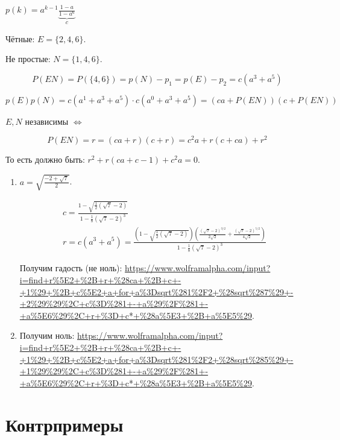 \documentclass[12pt, a4paper]{article}
\begin{document}
$p(k) = a^{k - 1} \underbrace{\frac{1 - a}{1 - a^6}}_c$

Чётные: $E = \{2, 4, 6\}$.

Не простые: $N = \{1, 4, 6\}$.

\begin{equation}
    P(EN) = P(\{4, 6\}) = p(N) - p_1 = p(E) - p_2 = c(a^3 + a^5)
\end{equation}

\begin{equation}
    p(E)p(N) = c(a^1 + a^3 + a^5) \cdot c(a^0 + a^3 + a^5) = (c a + P(EN))(c + P(EN))
\end{equation}

$E, N$ независимы $\Leftrightarrow$

\begin{equation}
    P(EN) = r = (ca + r)(c + r) = c^2 a + r(c + ca) + r^2
\end{equation}

То есть должно быть: $r^2 + r (ca + c - 1) + c^2 a = 0$.


\begin{enumerate}
    \item $a = \sqrt{\frac{-2+\sqrt{7}}{2}}$.
    
    \begin{gather}
        c = \frac{1 - \sqrt{\frac12 (\sqrt{7} - 2)}}{1 - \frac18 (\sqrt{7} - 2)^3} \\
        r = c(a^3 + a^5) = \frac{\left(1-\sqrt{\frac{1}{2}(\sqrt{7}-2)}\right)\left(\frac{(\sqrt{7}-2)^{3 / 2}}{2 \sqrt{2}}+\frac{(\sqrt{7}-2)^{5 / 2}}{4 \sqrt{2}}\right)}{1-\frac{1}{8}(\sqrt{7}-2)^3}
    \end{gather}

    Получим гадость (не ноль): \url{https://www.wolframalpha.com/input?i=find+r%5E2+%2B+r+%28ca+%2B+c+-+1%29+%2B+c%5E2+a+for+a%3Dsqrt%281%2F2+%28sqrt%287%29+-+2%29%29%2C+c%3D%281+-+a%29%2F%281+-+a%5E6%29%2C+r+%3D+c*+%28a%5E3+%2B+a%5E5%29}.


    \item Получим ноль: \url{https://www.wolframalpha.com/input?i=find+r%5E2+%2B+r+%28ca+%2B+c+-+1%29+%2B+c%5E2+a+for+a%3Dsqrt%281%2F2+%28sqrt%285%29+-+1%29%29%2C+c%3D%281+-+a%29%2F%281+-+a%5E6%29%2C+r+%3D+c*+%28a%5E3+%2B+a%5E5%29}.
\end{enumerate}


\section{Контрпримеры}
\end{document}
